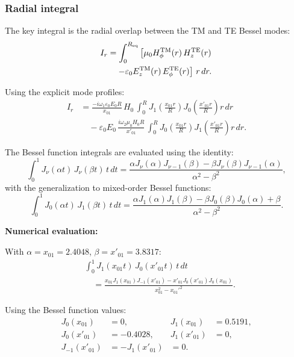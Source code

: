 \documentclass[12pt,aps,prd,twocolumn,superscriptaddress,nofootinbib]{revtex4-2}
\begin{document}
\subsubsection{Radial integral}

The key integral is the radial overlap between the TM and TE
Bessel modes:
\begin{align}
I_r &= \int_0^{R_{\rm eq}} \left[
\mu_0 H_\phi^{\rm TM}(r)\,H_z^{\rm TE}(r)
\right.\nonumber\\
&\left.\quad - \varepsilon_0 E_z^{\rm TM}(r)\,E_\phi^{\rm TE}(r)
\right]\,r\,dr.
\label{eq:I_r}
\end{align}

Using the explicit mode profiles:
\begin{align}
I_r &= \frac{-i\omega_1\varepsilon_0 E_0 R}{x_{01}}\,H_0\,
\int_0^R J_1\!\left(\frac{x_{01}r}{R}\right)
J_0\!\left(\frac{x'_{01}r}{R}\right)r\,dr
\nonumber\\
&\quad - \varepsilon_0 E_0\,\frac{i\omega_2\mu_0 H_0 R}{x'_{01}}\,
\int_0^R J_0\!\left(\frac{x_{01}r}{R}\right)
J_1\!\left(\frac{x'_{01}r}{R}\right)r\,dr.
\label{eq:I_r_explicit}
\end{align}

The Bessel function integrals are evaluated using the identity:
\begin{equation}
\int_0^1 J_\nu(\alpha t)\,J_\nu(\beta t)\,t\,dt
= \frac{\alpha J_\nu(\alpha)J_{\nu-1}(\beta)
- \beta J_\nu(\beta)J_{\nu-1}(\alpha)}{\alpha^2-\beta^2},
\label{eq:bessel_identity}
\end{equation}
with the generalization to mixed-order Bessel functions:
\begin{equation}
\int_0^1 J_0(\alpha t)\,J_1(\beta t)\,t\,dt
= \frac{\alpha J_1(\alpha)J_1(\beta)
-\beta J_0(\beta)J_0(\alpha)+\beta}{\alpha^2-\beta^2}.
\label{eq:bessel_01}
\end{equation}

\textbf{Numerical evaluation:}

With $\alpha = x_{01} = 2.4048$, $\beta = x'_{01} = 3.8317$:
\begin{align}
&\int_0^1 J_1(x_{01}t)\,J_0(x'_{01}t)\,t\,dt
\nonumber\\
&\quad = \frac{x_{01}J_1(x_{01})J_{-1}(x'_{01})
- x'_{01}J_0(x'_{01})J_0(x_{01})}
{x_{01}^2 - x_{01}'^2}.
\label{eq:bessel_num1}
\end{align}

Using the Bessel function values:
\begin{align}
J_0(x_{01}) &= 0, & J_1(x_{01}) &= 0.5191,
\nonumber\\
J_0(x'_{01}) &= -0.4028, & J_1(x'_{01}) &= 0,
\nonumber\\
J_{-1}(x'_{01}) &= -J_1(x'_{01}) &= 0.
\label{eq:bessel_values}
\end{align}
\end{document}
